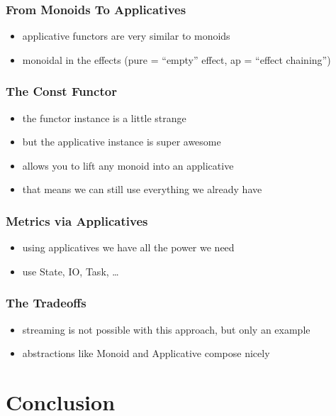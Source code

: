 \documentclass{beamer}
\begin{document}
\begin{frame}
  \frametitle{From Monoids To Applicatives}
  \begin{itemize}
  \item applicative functors are very similar to monoids
  \item monoidal in the effects (pure = ``empty'' effect, ap = ``effect chaining'')
  \end{itemize}
\end{frame}

\begin{frame}
  \frametitle{The Const Functor}
  \begin{itemize}
  \item the functor instance is a little strange
  \item but the applicative instance is super awesome
  \item allows you to lift any monoid into an applicative
  \item that means we can still use everything we already have
  \end{itemize}
\end{frame}

\begin{frame}
  \frametitle{Metrics via Applicatives}
  \begin{itemize}
  \item using applicatives we have all the power we need
  \item use State, IO, Task, \dots
  \end{itemize}
\end{frame}

\begin{frame}
  \frametitle{The Tradeoffs}
  \begin{itemize}
  \item streaming is not possible with this approach, but only an example
  \item abstractions like Monoid and Applicative compose nicely
  \end{itemize}
\end{frame}

\section{Conclusion}\label{sec:conclusion}

\begin{frame}
\end{frame}

\appendix{}
\end{document}
